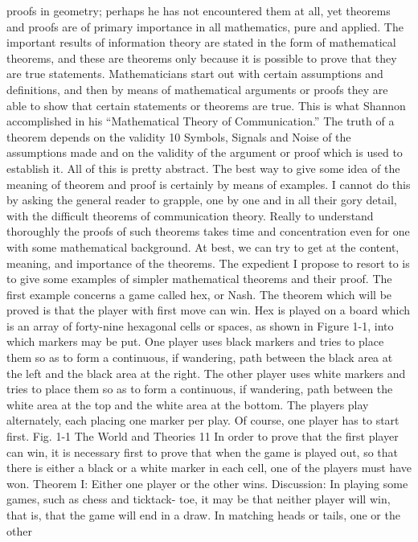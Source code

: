 proofs in geometry; perhaps he has not encountered them at all,
yet theorems and proofs are of primary importance in all mathematics,
pure and applied. The important results of information
theory are stated in the form of mathematical theorems, and these
are theorems only because it is possible to prove that they are true
statements.
Mathematicians start out with certain assumptions and definitions,
and then by means of mathematical arguments or proofs they
are able to show that certain statements or theorems are true. This
is what Shannon accomplished in his “Mathematical Theory of
Communication.” The truth of a theorem depends on the validity
10
Symbols, Signals and Noise
of the assumptions made and on the validity of the argument or
proof which is used to establish it.
All of this is pretty abstract. The best way to give some idea of
the meaning of theorem and proof is certainly by means of examples.
I cannot do this by asking the general reader to grapple,
one by one and in all their gory detail, with the difficult theorems
of communication theory. Really to understand thoroughly the
proofs of such theorems takes time and concentration even for one
with some mathematical background. At best, we can try to get
at the content, meaning, and importance of the theorems.
The expedient I propose to resort to is to give some examples
of simpler mathematical theorems and their proof. The first
example concerns a game called hex, or Nash. The theorem which
will be proved is that the player with first move can win.
Hex is played on a board which is an array of forty-nine hexagonal
cells or spaces, as shown in Figure 1-1, into which markers
may be put. One player uses black markers and tries to place them
so as to form a continuous, if wandering, path between the black
area at the left and the black area at the right. The other player uses
white markers and tries to place them so as to form a continuous,
if wandering, path between the white area at the top and the white
area at the bottom. The players play alternately, each placing one
marker per play. Of course, one player has to start first.
Fig. 1-1
The World and Theories 11
In order to prove that the first player can win, it is necessary
first to prove that when the game is played out, so that there is
either a black or a white marker in each cell, one of the players
must have won.
Theorem I: Either one player or the other wins.
Discussion: In playing some games, such as chess and ticktack-
toe, it may be that neither player will win, that is, that the game
will end in a draw. In matching heads or tails, one or the other
